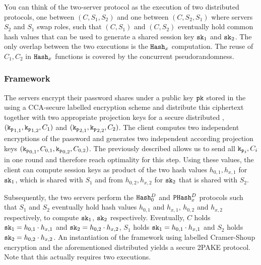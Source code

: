 You can think of the two-server protocol as the execution of two distributed \SPHFF protocols, one between $(C,S_1,S_2)$ and one between $(C,S_2,S_1)$ where servers $S_2$ and $S_1$ swap roles, such that $(C,S_1)$ and $(C,S_2)$ eventually hold common hash values that can be used to generate a shared session key $\mathtt{sk}_1$ and $\mathtt{sk}_2$.
The only overlap between the two \SPHFF executions is the $\mathtt{Hash}_x$ computation.
The reuse of $C_1,C_2$ in $\mathtt{Hash}_x$ functions is covered by the concurrent pseudorandomness.

\subsubsection{Framework}
The servers encrypt their password shares under a public key $\mathtt{pk}$ stored in the \crs using a CCA-secure labelled encryption scheme and distribute this ciphertext together with two appropriate projection keys for a secure distributed \SPHFF, $(\mathtt{k_p}_{1,1},\mathtt{k_p}_{1,2},C_1)$ and $(\mathtt{k_p}_{2,1},\mathtt{k_p}_{2,2},C_2)$.
The client computes two independent encryptions of the password and generates two independent according projection keys $(\mathtt{k_p}_{0,1},C_{0,1},\mathtt{k_p}_{0,2},C_{0,2})$.
The previously described \SPHFF allows us to send all $\mathtt{k_p}_i,C_i$ in one round and therefore reach optimality for this step.
Using these values, the client can compute session keys as product of the two hash values $h_{0,1},h_{x,1}$ for $\mathtt{sk}_1$, which is shared with $S_1$ and from $h_{0,2},h_{x,2}$ for $\mathtt{sk}_2$ that is shared with $S_2$.

Subsequently, the two servers perform the $\mathtt{Hash}_0^D$ and $\mathtt{PHash}_x^D$ protocols such that $S_1$ and $S_2$ eventually hold hash values $h_{0,1}$ and $h_{x,1}$, $h_{0,2}$ and $h_{x,2}$ respectively, to compute $\mathtt{sk}_1$, $\mathtt{sk}_2$ respectively.
Eventually, $C$ holds $\mathtt{sk}_1=h_{0,1}\cdot h_{x,1}$ and $\mathtt{sk}_2=h_{0,2}\cdot h_{x,2}$, $S_1$ holds $\mathtt{sk}_1=h_{0,1}\cdot h_{x,1}$ and $S_2$ holds $\mathtt{sk}_2=h_{0,2}\cdot h_{x,2}$.
An instantiation of the framework using labelled Cramer-Shoup encryption and the aforementioned distributed \SPHFF yields a secure 2PAKE protocol.
Note that this actually requires two \SPHFF executions.


